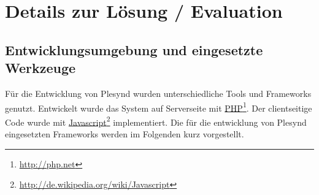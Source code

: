 \chapter{Details zur Lösung / Evaluation} 
\label{chapter:Kapitel6}

\section{Entwicklungsumgebung und eingesetzte Werkzeuge}\label{section:entwicklungsumgebungen_tools}
Für die Entwicklung von Plesynd wurden unterschiedliche Tools und Frameworks genutzt. Entwickelt wurde das System auf Serverseite mit \href{http://php.net}{PHP}\footnote{\url{http://php.net}}. Der clientseitige Code wurde mit \href{http://de.wikipedia.org/wiki/Javascript}{Javascript}\footnote{\url{http://de.wikipedia.org/wiki/Javascript}} implementiert. Die für die entwicklung von Plesynd eingesetzten Frameworks werden im Folgenden kurz vorgestellt.


